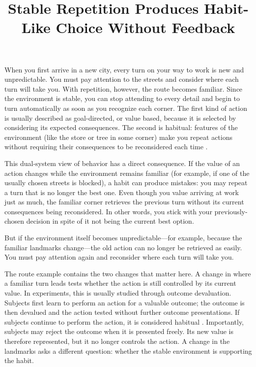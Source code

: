 \documentclass[man,natbib,floatsintext]{apa7}
\title{Stable Repetition Produces Habit-Like Choice Without Feedback}
\begin{document}
\maketitle

When you first arrive in a new city, every turn on your way to work is new and unpredictable. You must pay attention to the streets and consider where each turn will take you. With repetition, however, the route becomes familiar. Since the environment is stable, you can stop attending to every detail and begin to turn automatically as soon as you recognize each corner. The first kind of action is usually described as goal-directed, or value based, because it is selected by considering its expected consequences. The second is habitual: features of the environment (like the store or tree in some corner) make you repeat actions without requiring their consequences to be reconsidered each time \citep{wood2002,buyalskaya2023can}.

This dual-system view of behavior has a direct consequence. If the value of an action changes while the environment remains familiar (for example, if one of the usually chosen streets is blocked), a habit can produce mistakes: you may repeat a turn that is no longer the best one. Even though you value arriving at work just as much, the familiar corner retrieves the previous turn without its current consequences being reconsidered. In other words, you stick with your previously-chosen decision in spite of it not being the current best option. 

But if the environment itself becomes unpredictable---for example, because the familiar landmarks change---the old action can no longer be retrieved as easily. You must pay attention again and reconsider where each turn will take you.

The route example contains the two changes that matter here. A change in where a familiar turn leads tests whether the action is still controlled by its current value. In experiments, this is usually studied through outcome devaluation. Subjects first learn to perform an action for a valuable outcome; the outcome is then devalued and the action tested without further outcome presentations. If subjects continue to perform the action, it is considered habitual \citep{adamsDickinson1981,dickinson1985,perezDickinson2020}. Importantly, subjects may reject the outcome when it is presented freely. Its new value is therefore represented, but it no longer controls the action. A change in the landmarks asks a different question: whether the stable environment is supporting the habit.
\end{document}
